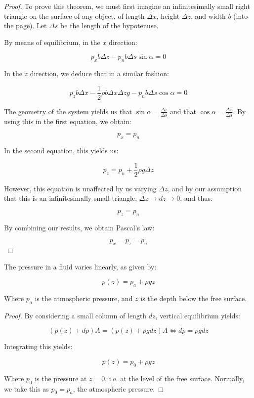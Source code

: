 \documentclass{article}
\begin{document}
\begin{proof}
    To prove this theorem, we must first imagine an infinitesimally small right triangle on the surface of any object, of length $\Delta x$, height $\Delta z$, and width $b$ (into the page). Let $\Delta s$ be the length of the hypotenuse.

    By means of equilibrium, in the $x$ direction:

    \[ p_xb\Delta z - p_nb\Delta s \sin{\alpha} = 0\]

    In the $z$ direction, we deduce that in a similar fashion:

    \[ p_zb\Delta x - \frac{1}{2}\rho b \Delta x\Delta zg - p_nb\Delta s\cos{\alpha} = 0\]

    The geometry of the system yields us that $\sin{\alpha} = \frac{\Delta z}{\Delta s}$ and that $\cos{\alpha} = \frac{\Delta x}{\Delta s}$. By using this in the first equation, we obtain:

    \[ p_x = p_n \]

    In the second equation, this yields us:

    \[ p_z = p_n + \frac{1}{2}\rho g\Delta z \]

    However, this equation is unaffected by us varying $\Delta z$, and by our assumption that this is an infinitesimally small triangle, $\Delta z \to dz \to 0$, and thus:

    \[ p_z = p_n \]

    By combining our results, we obtain Pascal's law:

    \[ p_x = p_z = p_n \]
\end{proof}

\begin{proposition}
    The pressure in a fluid varies linearly, as given by:

    \[ p(z) = p_a + \rho gz \]

    Where $p_a$ is the atmospheric pressure, and $z$ is the depth below the free surface.
\end{proposition}

\begin{proof}
    By considering a small column of length $dz$, vertical equilibrium yields:

    \[ (p(z) + dp)A = (p(z) + \rho gdz)A \iff dp = \rho g dz \]

    Integrating this yields:

    \[ p(z) = p_0 + \rho gz \]

    Where $p_0$ is the pressure at $z = 0$, i.e. at the level of the free surface. Normally, we take this as $p_0 = p_a$, the atmospheric pressure.
\end{proof}
\end{document}
